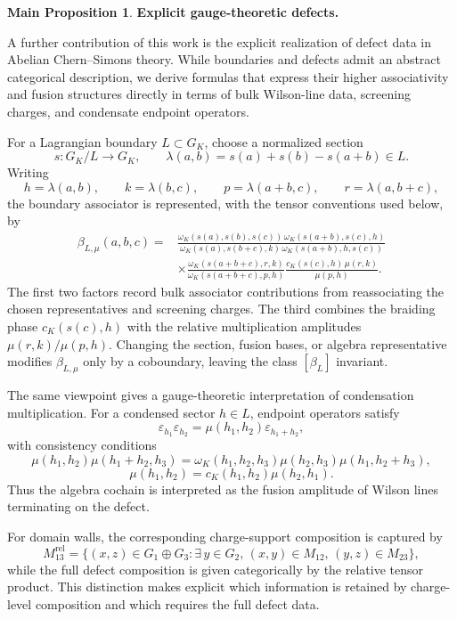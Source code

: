 \documentclass[12pt]{amsart}
\numberwithin{equation}{section}
\theoremstyle{definition}
\newtheorem*{propositionA}{Main Proposition}
\begin{document}
\begin{propositionA}\textbf{Explicit gauge-theoretic defects.}

A further contribution of this work is the explicit realization of defect data in Abelian Chern--Simons theory. While boundaries and defects admit an abstract categorical description, we derive formulas that express their higher associativity and fusion structures directly in terms of bulk Wilson-line data, screening charges, and condensate endpoint operators.

For a Lagrangian boundary $L\subset G_K$, choose a normalized section
$$
s:G_K/L\longrightarrow G_K,
\qquad
\lambda(a,b)=s(a)+s(b)-s(a+b)\in L .
$$
Writing
$$
h=\lambda(a,b),\qquad
k=\lambda(b,c),\qquad
p=\lambda(a+b,c),\qquad
r=\lambda(a,b+c),
$$
the boundary associator is represented, with the tensor conventions used
below, by
$$
\begin{aligned}
\beta_{L,\mu}(a,b,c)
={}&
\frac{
\omega_K(s(a),s(b),s(c))\,
\omega_K(s(a+b),s(c),h)
}{
\omega_K(s(a),s(b+c),k)\,
\omega_K(s(a+b),h,s(c))
}
\\
&\times
\frac{
\omega_K(s(a+b+c),r,k)
}{
\omega_K(s(a+b+c),p,h)
}
\frac{
c_K(s(c),h)\,\mu(r,k)
}{
\mu(p,h)
}.
\end{aligned}
$$
The first two factors record bulk associator contributions from reassociating the chosen representatives and screening charges. The third combines the braiding phase $c_K(s(c),h)$ with the relative multiplication amplitudes $\mu(r,k)/\mu(p,h)$.  Changing the section, fusion bases, or algebra representative modifies $\beta_{L,\mu}$ only by a coboundary, leaving the class $[\beta_L]$ invariant.

The same viewpoint gives a gauge-theoretic interpretation of condensation multiplication. For a condensed sector $h\in L$, endpoint operators satisfy
$$
\varepsilon_{h_1}\varepsilon_{h_2}
=
\mu(h_1,h_2)\varepsilon_{h_1+h_2},
$$
with consistency conditions
$$
\mu(h_1,h_2)\mu(h_1+h_2,h_3)
=
\omega_K(h_1,h_2,h_3)
\mu(h_2,h_3)\mu(h_1,h_2+h_3),
$$
$$
\mu(h_1,h_2)
=
c_K(h_1,h_2)\mu(h_2,h_1).
$$
Thus the algebra cochain is interpreted as the fusion amplitude of Wilson lines terminating on the defect.

For domain walls, the corresponding charge-support composition is captured by
$$
M_{13}^{\mathrm{rel}}
=
\{(x,z)\in G_1\oplus G_3:
\exists\,y\in G_2,\,
(x,y)\in M_{12},\,
(y,z)\in M_{23}\},
$$
while the full defect composition is given categorically by the relative tensor product. This distinction makes explicit which information is retained by charge-level composition and which requires the full defect data.



\end{propositionA}
\end{document}
